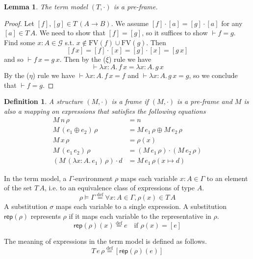 \documentclass{tufte-handout}
\newcommand{\defeq}[0]{\overset{\mathrm{def}}{=}}
\newcommand{\LAM}[1]{\lambda #1.\,}
\newcommand{\APP}[0]{\,}
\newcommand{\of}[0]{\!:\!}
\newcommand{\ext}[3]{#3(#1{\mapsto}#2)}
\newtheorem{lemma}[theorem]{Lemma}
\newtheorem{definition}{Definition}%
\begin{document}
\begin{lemma}
  The term model $(T,\cdot)$ is a pre-frame.
\end{lemma}
\begin{proof}
Let $[f],[g] \in T\,(A\to B)$.  We assume $[f] \cdot [a] = [g] \cdot
[a]$ for any $[a]\in T\,A$.  We need to show that $[f] = [g]$, so it
suffices to show $\vdash f = g$.  Find some $x : A \in \mathcal{G}$
s.t. $x \notin \mathrm{FV}(f) \cup \mathrm{FV}(g)$.  Then
\[
  [f \APP x] = [f] \cdot [x] = [g] \cdot [x] = [g \APP x]
\]
and so $\vdash f \APP x = g \APP x$. Then by the ($\xi$) rule we have
\[
\vdash \LAM{x\of A} f \APP x = \LAM{x\of A} g \APP x
\]
By the ($\eta$) rule we have $\vdash \LAM{x\of A} f \APP x = f$ and
$\vdash \LAM{x\of A} g \APP x = g$, so we conclude that $\vdash f = g$.
\end{proof}

\begin{definition}
A structure $(M,\cdot)$ is a \emph{frame} if $(M,\cdot)$ is a
pre-frame and $M$ is also a mapping on expressions that satisfies the
following equations
\begin{align*}
  M\,n\,\rho &= n \\
  M\,(e_1 \oplus e_2)\,\rho &= M\,e_1\,\rho \oplus M\,e_2\,\rho \\
  M\,x\,\rho &= \rho(x) \\
  M\,(e_1\APP e_2)\,\rho &= (M\,e_1\,\rho) \cdot (M\,e_2\,\rho) \\
  (M\,(\LAM{x\of A} e_1)\,\rho) \cdot d &=
    M\,e_1\,\ext{x}{d}{\rho}
\end{align*}
\end{definition}

In the term model, a $\Gamma$-environment $\rho$ maps each variable $x
: A \in \Gamma$ to an element of the set $T\,A$, i.e. to an
equivalence class of expressions of type $A$.
\[
  \rho \models \Gamma \defeq \forall x:A \in \Gamma, \rho(x) \in T\,A
\]
A substitution $\sigma$ maps each variable to a single expression. A
substitution $\mathsf{rep}(\rho)$ represents $\rho$ if it maps each
variable to the representative in $\rho$.
\[
  \mathsf{rep}(\rho)(x) \defeq e \quad \text{if } \rho(x) = [e]
\]

The meaning of expressions in the term model is defined as follows.
\[
  T\,e\,\rho \defeq [\mathsf{rep}(\rho)(e)]
\]
\end{document}
